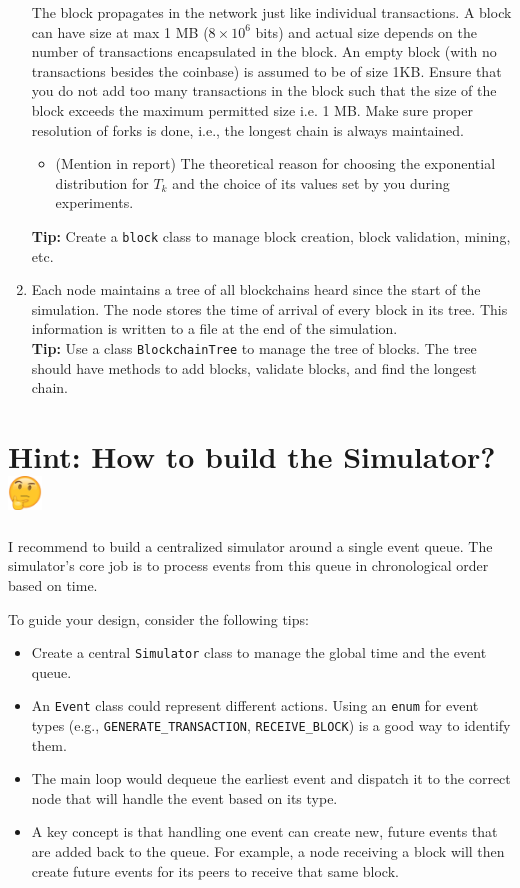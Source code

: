 \documentclass[12pt]{extarticle}
\newcommand{\thinking}{\includegraphics[height=1.2em]{thinking.png}}
\begin{document}
\begin{enumerate}
          The block propagates in the network just like individual transactions. A block can have size at max 1 MB ($8 \times 10^6$ bits) and actual size depends on the number of transactions encapsulated in the block. An empty block (with no transactions besides the coinbase) is assumed to be of size 1KB. Ensure that you do not add too many transactions in the block such that the size of the block exceeds the maximum permitted size i.e. 1 MB. Make sure proper resolution of forks is done, i.e., the longest chain is always maintained.
          \begin{itemize}
              \item (Mention in report) The theoretical reason for choosing the exponential distribution for $T_k$ and the choice of its values set by you during experiments.
          \end{itemize}
          \textbf{Tip:} Create a \texttt{block} class to manage block creation, block validation, mining, etc.

    \item Each node maintains a tree of all blockchains heard since the start of the simulation. The node stores the time of arrival of every block in its tree. This information is written to a file at the end of the simulation.\\ \textbf{Tip:} Use a class \texttt{BlockchainTree} to manage the tree of blocks. The tree should have methods to add blocks, validate blocks, and find the longest chain.
\end{enumerate}
\hrulefill

\section*{Hint: How to build the Simulator? \thinking}
I recommend to build a centralized simulator around a single event queue. The simulator's core job is to process events from this queue in chronological order based on time.

To guide your design, consider the following tips:
\begin{itemize}
    \item Create a central \texttt{Simulator} class to manage the global time and the event queue.
    \item An \texttt{Event} class could represent different actions. Using an \texttt{enum} for event types (e.g., \texttt{GENERATE\_TRANSACTION}, \texttt{RECEIVE\_BLOCK}) is a good way to identify them.
    \item The main loop would dequeue the earliest event and dispatch it to the correct node that will handle the event based on its type.
    \item A key concept is that handling one event can create new, future events that are added back to the queue.  For example, a node receiving a block will then create future events for its peers to receive that same block.
\end{itemize}
\end{document}
